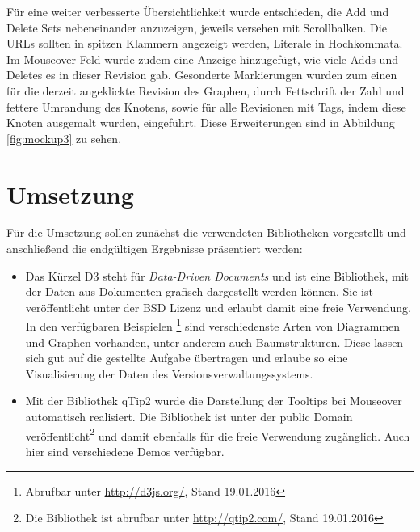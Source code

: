 \documentclass[nocolor]{tudbook}
\begin{document}
Für eine weiter verbesserte Übersichtlichkeit wurde entschieden, die Add und Delete Sets nebeneinander anzuzeigen, jeweils versehen mit Scrollbalken. Die URLs sollten in spitzen Klammern angezeigt werden, Literale in Hochkommata. Im Mouseover Feld wurde zudem eine Anzeige hinzugefügt, wie viele Adds und Deletes es in dieser Revision gab. Gesonderte Markierungen wurden zum einen für die derzeit angeklickte Revision des Graphen, durch Fettschrift der Zahl und fettere Umrandung des Knotens, sowie für alle Revisionen mit Tags, indem diese Knoten ausgemalt wurden, eingeführt. Diese Erweiterungen sind in Abbildung \ref{fig:mockup3} zu sehen.

\section{Umsetzung}
Für die Umsetzung sollen zunächst die verwendeten Bibliotheken vorgestellt und anschließend die endgültigen Ergebnisse präsentiert werden:
\begin{itemize}
\item Das Kürzel D3 steht für \textit{Data-Driven Documents} und ist eine Bibliothek, mit der Daten aus Dokumenten grafisch 				dargestellt werden können. Sie ist veröffentlicht unter der BSD Lizenz und erlaubt damit eine freie Verwendung. In den 				verfügbaren Beispielen \footnote{Abrufbar unter \url{http://d3js.org/}, Stand 19.01.2016} sind verschiedenste Arten von 			Diagrammen und Graphen vorhanden, unter anderem auch Baumstrukturen. Diese lassen sich gut auf die gestellte Aufgabe 			übertragen und erlaube so eine Visualisierung der Daten des Versionsverwaltungssystems.

\item Mit der Bibliothek qTip2 wurde die Darstellung der Tooltips bei Mouseover automatisch realisiert. Die Bibliothek ist unter der 			public Domain veröffentlicht\footnote{Die Bibliothek ist abrufbar unter \url{http://qtip2.com/}, Stand 19.01.2016} und damit 			ebenfalls für die freie Verwendung zugänglich. Auch hier sind verschiedene Demos verfügbar.
\end{itemize}



\listoffigures
\end{document}
